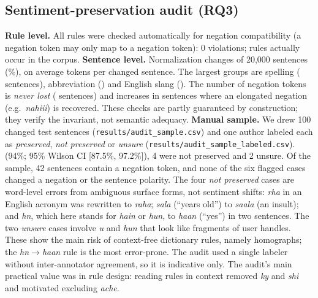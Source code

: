 \documentclass[10pt,twocolumn,letterpaper]{article}
\begin{document}
\subsection{Sentiment-preservation audit (RQ3)}
\label{sec:audit}
\textbf{Rule level.} All \RulesTotal{} rules were checked automatically for negation compatibility (a negation token may only map to a negation token): 0 violations; \RulesObserved{} rules actually occur in the corpus. \textbf{Sentence level.} Normalization changes \ChangedAll{} of 20{,}000 sentences (\ChangedPct\%), on average \TokPerChanged{} tokens per changed sentence. The largest groups are spelling (\ChgSpelling{} sentences), abbreviation (\ChgAbbreviation) and English slang (\ChgEnglishSlang). The number of negation tokens is \emph{never lost} (\NegLost{} sentences) and increases in \NegRecovered{} sentences where an elongated negation (e.g.\ \emph{nahiii}) is recovered. These checks are partly guaranteed by construction; they verify the invariant, not semantic adequacy. \textbf{Manual sample.} We drew 100 changed test sentences (\texttt{results/audit\_sample.csv}) and one author labeled each as \emph{preserved}, \emph{not preserved} or \emph{unsure} (\texttt{results/audit\_sample\_labeled.csv}). \ManualAudit{} (94\%; 95\% Wilson CI [87.5\%, 97.2\%]), 4 were not preserved and 2 unsure. Of the sample, 42 sentences contain a negation token, and none of the six flagged cases changed a negation or the sentence polarity. The four \emph{not preserved} cases are word-level errors from ambiguous surface forms, not sentiment shifts: \emph{rha} in an English acronym was rewritten to \emph{raha}; \emph{sala} (``years old'') to \emph{saala} (an insult); and \emph{hn}, which here stands for \emph{hain} or \emph{hun}, to \emph{haan} (``yes'') in two sentences. The two \emph{unsure} cases involve \emph{u} and \emph{hun} that look like fragments of user handles. These show the main risk of context-free dictionary rules, namely homographs; the \emph{hn$\to$haan} rule is the most error-prone. The audit used a single labeler without inter-annotator agreement, so it is indicative only. The audit's main practical value was in rule design: reading rules in context removed \emph{ky} and \emph{shi} and motivated excluding \emph{ache}.
\end{document}
